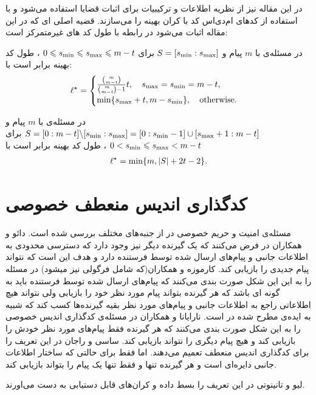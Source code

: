 در این مقاله نیز از نظریه اطلاعات و ترکیبیات برای اثبات قضایا استفاده می‌شود و با استفاده از کدهای ام‌دی‌اس کد با کران بهینه را می‌سازند. قضیه اصلی ای که در این مقاله اثبات می‌شود در رابطه با طول کد های غیرمتمرکز است:
\begin{theorem}[consecutive]
	\label{thm:consecutive_s}
	در مسئله‌ی
	با
	$m$ 
	پیام و
	  $S=[s_{\rm min}:s_{\rm max}]$
	  برای
	  $0\leqslant s_{\rm min} \leqslant s_{\rm max} \leqslant m-t$
	  ، طول کد بهینه برابر است با:
	\begin{align}
		\ell^{\star}=\begin{cases}
			\frac{\binom{m}{m-t}}{\binom{m}{m-t}-1}  t, \quad s_{\rm max}=s_{\rm min}=m-t,\\
			\min\{s_{\rm max}+t, m-s_{\rm min}\}, \quad \text{otherwise.}
		\end{cases}
		\label{eq:thm:consecutive_s}
	\end{align}
\end{theorem}


\begin{theorem}[complement-consecutive]
	\label{thm:complement_consecutive_s}
	در مسئله‌ی
با
 $m$ 
 پیام
 و
 $S=[0:m-t]\backslash [s_{\rm min}:s_{\rm max}] = [0:s_{\rm min}-1]\cup[s_{\rm max}+1:m-t]$
 برای
 $0 < s_{\rm min} \leqslant s_{\rm max} < m-t$
 ، طول کد بهینه برابر است با
	\begin{align}
		\ell^{\star}=\min\{m,|S|+2t-2\}.
		\label{eq:thm:complement_consecutive_s}
	\end{align}
\end{theorem}

\section{کدگذاری اندیس منعطف خصوصی}
\label{sec:privatepliable}
مسئله‌ی امنیت و حریم خصوصی در 
\icod
 از جنبه‌های مختلف بررسی شده است. دائو و همکاران در
\cite{6166891}
فرض می‌کنند که یک گیرنده دیگر نیز وجود دارد که دسترسی محدودی به اطلاعات جانبی و پیام‌های ارسال شده توسط فرستنده دارد و هدف این است که نتواند پیام جدیدی را بازیابی کند. کارموزه و همکاران(که شامل فرگولی نیز میشود) در
\cite{8006988}
مسئله را به این این شکل صورت بندی می‌کنند که پیام‌های ارسال شده توسط فرستنده باید به گونه ای باشد که هر گیرنده بتواند پیام مورد نظر خود را بازیابی ولی نتواند هیچ اطلاعاتی راجع به اطلاعات جانبی و پیام‌های مورد نظر بقیه گیرنده‌ها کسب کند که شبیه به ایده‌ی
	مطرح شده در
\cite{7889028}
است.
نارایانا و همکاران در
\cite{9627083}
مسئله‌ی کدگذاری اندیس خصوصی را به این شکل صورت بندی می‌کنند که هر گیرنده فقط پیام‌های مورد نظر خودش را بازیابی کند و هیچ پیام دیگری را نتواند بازیابی کند. ساسی و راجان در
\cite{sasi2019pliable}
این تعریف را برای کدگذاری اندیس منعطف تعمیم می‌دهند. اما فقط برای حالتی که ساختار اطلاعات جانبی دایره‌ای است و هر گیرنده تنها و فقط تنها یک پیام را بتواند بازیابی کند.

لیو و تانینوتی در 
\cite{8989161}
این تعریف را بسط داده و کران‌های قابل دستیابی به دست می‌اورند.